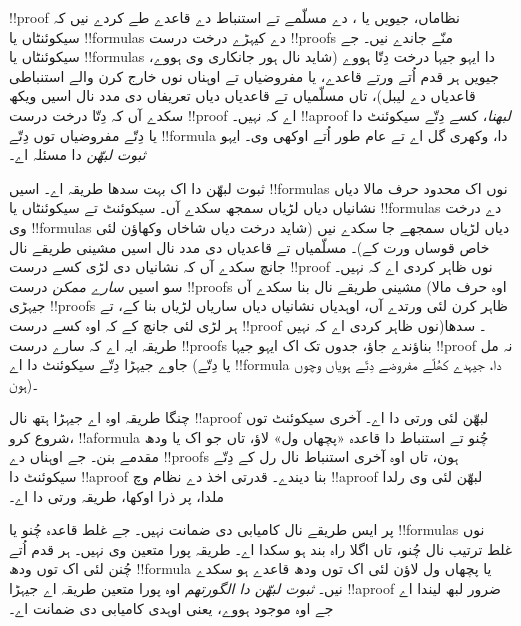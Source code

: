 \documentclass[../../../include/open-logic-section]{subfiles}
\begin{document}


!!{proof} نظاماں، جیویں  یا ، دے مسلّمے تے استنباط دے قاعدے طے کردے نیں کہ سیکوئنٹاں یا !!{formula}s دے کیہڑے درخت درست !!{proof}s منّے جاندے نیں۔ جے سیکوئنٹاں یا !!{formula}s دا ایہو جیہا درخت دِتّا ہووے (شاید نال ہور جانکاری وی ہووے، جیویں ہر قدم اُتے ورتے قاعدے، یا مفروضیاں تے اوہناں نوں خارج کرن والے استنباطی قاعدیاں دے لیبل)، تاں مسلّمیاں تے قاعدیاں دیاں تعریفاں دی مدد نال اسیں ویکھ سکدے آں کہ دِتّا درخت درست !!{proof} اے کہ نہیں۔ !!a{proof} \emph{لبھنا}، کسے دِتّے سیکوئنٹ دا یا دِتّے مفروضیاں توں دِتّے !!{formula} دا، وکھری گل اے تے عام طور اُتے اوکھی وی۔ ایہو \emph{ثبوت لبھّن} دا مسئلہ اے۔

ثبوت لبھّن دا اک بہت سدھا طریقہ اے۔ اسیں !!{formula}s نوں اک محدود حرف مالا دیاں نشانیاں دیاں لڑیاں سمجھ سکدے آں۔ سیکوئنٹ تے سیکوئنٹاں یا !!{formula}s دے درخت وی !!{formula}s دیاں لڑیاں سمجھے جا سکدے نیں (شاید درخت دیاں شاخاں وکھاؤن لئی خاص قوساں ورت کے)۔ مسلّمیاں تے قاعدیاں دی مدد نال اسیں مشینی طریقے نال جانچ سکدے آں کہ نشانیاں دی لڑی کسے درست !!{proof} نوں ظاہر کردی اے کہ نہیں۔ سو اسیں \emph{سارے ممکن} درست !!{proof}s مشینی طریقے نال بنا سکدے آں (اوہ حرف مالا جیہڑی !!{proof}s ظاہر کرن لئی ورتدے آں، اوہدیاں نشانیاں دیاں ساریاں لڑیاں بنا کے، تے ہر لڑی لئی جانچ کے کہ اوہ کسے درست !!{proof} نوں ظاہر کردی اے کہ نہیں)۔ سدھا طریقہ ایہ اے کہ سارے درست !!{proof}s بناؤندے جاؤ، جدوں تک اک ایہو جیہا !!{proof} نہ مل جاوے جیہڑا دِتّے سیکوئنٹ دا اے (یا دِتّے !!{formula} دا، جیہدے کھُلّے مفروضے دِتّے ہویاں وچوں ہون)۔

چنگا طریقہ اوہ اے جیہڑا ہتھ نال !!a{proof} لبھّن لئی ورتی دا اے۔ آخری سیکوئنٹ توں شروع کرو، !!a{formula} چُنو تے استنباط دا قاعدہ «پچھاں ول» لاؤ، تاں جو اک یا ودھ مقدمے بنن۔ جے اوہناں دے !!{proof}s ہون، تاں اوہ آخری استنباط نال رل کے دِتّے سیکوئنٹ دا !!a{proof} بنا دیندے۔ قدرتی اخذ دے نظام وچ !!a{proof} لبھّن لئی وی رلدا ملدا، پر ذرا اوکھا، طریقہ ورتی دا اے۔

پر ایس طریقے نال کامیابی دی ضمانت نہیں۔ جے غلط قاعدہ چُنو یا !!{formula}s نوں غلط ترتیب نال چُنو، تاں اگلا راہ بند ہو سکدا اے۔ طریقہ پورا متعین وی نہیں۔ ہر قدم اُتے چُنن لئی اک توں ودھ !!{formula} یا پچھاں ول لاؤن لئی اک توں ودھ قاعدے ہو سکدے نیں۔ \emph{ثبوت لبھّن دا الگورتھم} اوہ پورا متعین طریقہ اے جیہڑا !!a{proof} ضرور لبھ لیندا اے جے اوہ موجود ہووے، یعنی اوہدی کامیابی دی ضمانت اے۔
\end{document}
